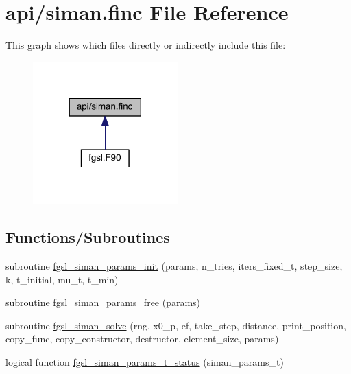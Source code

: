 \hypertarget{siman_8finc}{\section{api/siman.finc File Reference}
\label{siman_8finc}
}
This graph shows which files directly or indirectly include this file\-:\nopagebreak
\begin{figure}[H]
\begin{center}
\leavevmode
\includegraphics[width=158pt]{siman_8finc__dep__incl}
\end{center}
\end{figure}
\subsection*{Functions/\-Subroutines}
\begin{DoxyCompactItemize}
\item 
subroutine \hyperlink{siman_8finc_adcfa0c681728d5c3e90be5349806375b}{fgsl\-\_\-siman\-\_\-params\-\_\-init} (params, n\-\_\-tries, iters\-\_\-fixed\-\_\-t, step\-\_\-size, k, t\-\_\-initial, mu\-\_\-t, t\-\_\-min)
\item 
subroutine \hyperlink{siman_8finc_a8b4f3ab19289692f276bbb194756b38d}{fgsl\-\_\-siman\-\_\-params\-\_\-free} (params)
\item 
subroutine \hyperlink{siman_8finc_a3f8e1e92cd57d563d21153e5bf61f0cc}{fgsl\-\_\-siman\-\_\-solve} (rng, x0\-\_\-p, ef, take\-\_\-step, distance, print\-\_\-position, copy\-\_\-func, copy\-\_\-constructor, destructor, element\-\_\-size, params)
\item 
logical function \hyperlink{siman_8finc_a1e555a955ce705b0a8833ea6e6822ae8}{fgsl\-\_\-siman\-\_\-params\-\_\-t\-\_\-status} (siman\-\_\-params\-\_\-t)
\end{DoxyCompactItemize}


